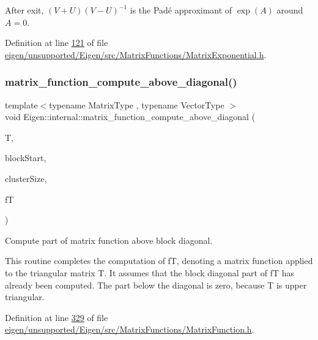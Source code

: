 After exit, $ (V+U)(V-U)^{-1} $ is the Pad\'{e} approximant of $ \exp(A) $ around $ A = 0 $. 

Definition at line \hyperlink{eigen_2unsupported_2_eigen_2src_2_matrix_functions_2_matrix_exponential_8h_source_l00121}{121} of file \hyperlink{eigen_2unsupported_2_eigen_2src_2_matrix_functions_2_matrix_exponential_8h_source}{eigen/unsupported/\+Eigen/src/\+Matrix\+Functions/\+Matrix\+Exponential.\+h}.

\mbox{\label{namespace_eigen_1_1internal_a8ff76c47bde59d8af688e5925bed8f17}} 
\subsubsection{\texorpdfstring{matrix\+\_\+function\+\_\+compute\+\_\+above\+\_\+diagonal()}{matrix\_function\_compute\_above\_diagonal()}}
{\footnotesize\ttfamily template$<$typename Matrix\+Type , typename Vector\+Type $>$ \\
void Eigen\+::internal\+::matrix\+\_\+function\+\_\+compute\+\_\+above\+\_\+diagonal (\begin{DoxyParamCaption}\item[{const Matrix\+Type \&}]{T,  }\item[{const \hyperlink{struct_vector_type}{Vector\+Type} \&}]{block\+Start,  }\item[{const \hyperlink{struct_vector_type}{Vector\+Type} \&}]{cluster\+Size,  }\item[{Matrix\+Type \&}]{fT }\end{DoxyParamCaption})}



Compute part of matrix function above block diagonal. 

This routine completes the computation of {\ttfamily fT}, denoting a matrix function applied to the triangular matrix {\ttfamily T}. It assumes that the block diagonal part of {\ttfamily fT} has already been computed. The part below the diagonal is zero, because {\ttfamily T} is upper triangular. 

Definition at line \hyperlink{eigen_2unsupported_2_eigen_2src_2_matrix_functions_2_matrix_function_8h_source_l00329}{329} of file \hyperlink{eigen_2unsupported_2_eigen_2src_2_matrix_functions_2_matrix_function_8h_source}{eigen/unsupported/\+Eigen/src/\+Matrix\+Functions/\+Matrix\+Function.\+h}.

